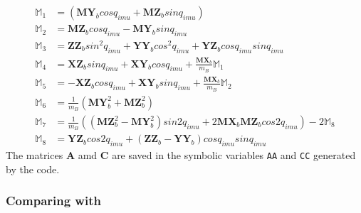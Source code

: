 \documentclass[a4paper,10pt]{article}
\begin{document}
\begin{align}
 \mathbb{M}_1 &= \left(\mathbf{MY}_bcosq_{imu}+\mathbf{MZ}_bsinq_{imu}\right) \nonumber \\
 \mathbb{M}_2 &= \mathbf{MZ}_bcosq_{imu}-\mathbf{MY}_bsinq_{imu} \nonumber \\
 \mathbb{M}_3 &= \mathbf{ZZ}_bsin^2q_{imu}+\mathbf{YY}_bcos^2q_{imu}+\mathbf{YZ}_bcosq_{imu}sinq_{imu} \nonumber \\
 \mathbb{M}_4 &= \mathbf{XZ}_bsinq_{imu}+\mathbf{XY}_bcosq_{imu}+\frac{\mathbf{MX}_b}{m_B}\mathbb{M}_1 \nonumber \\
 \mathbb{M}_5 &= -\mathbf{XZ}_bcosq_{imu}+\mathbf{XY}_bsinq_{imu}+\frac{\mathbf{MX}_b}{m_B}\mathbb{M}_2 \nonumber \\
 \mathbb{M}_6 &= \frac{1}{m_B}\left(\mathbf{MY}_b^2+\mathbf{MZ}_b^2\right) \nonumber \\
 \mathbb{M}_7 &= \frac{1}{m_B}\left(\left(\mathbf{MZ}_b^2-\mathbf{MY}_b^2\right)sin2q_{imu}+2\mathbf{MX}_b\mathbf{MZ}_bcos2q_{imu}\right) - 2\mathbb{M}_8 \nonumber \\
 \mathbb{M}_8 &= \mathbf{YZ}_bcos2q_{imu}+\left(\mathbf{ZZ}_b-\mathbf{YY}_b\right)cosq_{imu}sinq_{imu} \nonumber
\end{align}
The matrices $\mathbf{A}$ amd $\mathbf{C}$ are saved in the symbolic variables \texttt{AA} and \texttt{CC} generated by the code.

\subsubsection{Comparing with \cite{kim2005dynamic}}
\end{document}
